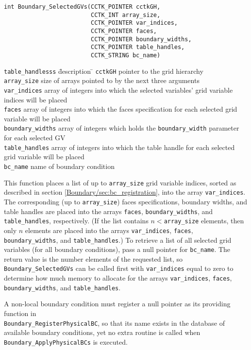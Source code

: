 \documentclass{article}
\begin{document}
\begin{verbatim}
int Boundary_SelectedGVs(CCTK_POINTER cctkGH, 
                         CCTK_INT array_size,
                         CCTK_POINTER var_indices,
                         CCTK_POINTER faces,
                         CCTK_POINTER boundary_widths,
                         CCTK_POINTER table_handles,
                         CCTK_STRING bc_name)
\end{verbatim}
\begin{tabbing}
\texttt{table\_handlesss} \= description \=\kill
\texttt{cctkGH} \> pointer to the grid hierarchy\\
\texttt{array\_size} \> size of arrays pointed to by the next three arguments\\
\texttt{var\_indices} \> array of integers into which the selected variables' grid variable indices will be placed\\
\texttt{faces} \> array of integers into which the faces specification for each selected grid variable will be placed\\
\texttt{boundary\_widths} \> array of integers which holds the \texttt{boundary\_width} parameter for each selected GV\\
\texttt{table\_handles} \> array of integers into which the table handle for each selected grid variable will be placed\\
\texttt{bc\_name} \> name of boundary condition
\end{tabbing}
This function places a list of up to \texttt{array\_size} grid
variable indices, sorted as described in section
\ref{Boundary/sec:bc_registration}, into the array \texttt{var\_indices}.  The
corresponding (up to \texttt{array\_size}) faces specifications,
boundary widths, and table handles are placed into the arrays
\texttt{faces}, \texttt{boundary\_widths}, and
\texttt{table\_handles}, respectively.  (If the list contains
$n<$\texttt{array\_size} elements, then only $n$ elements are placed
into the arrays \texttt{var\_indices}, \texttt{faces},
\texttt{boundary\_widths}, and \texttt{table\_handles}.)  To retrieve
a list of all selected grid variables (for all boundary conditions),
pass a null pointer for \texttt{bc\_name}.  The return value is the
number elements of the requested list, so
\texttt{Boundary\_SelectedGVs} can be called first with
\texttt{var\_indices} equal to zero to determine how much memory to
allocate for the arrays \texttt{var\_indices}, \texttt{faces},
\texttt{boundary\_widths}, and \texttt{table\_handles}.

A non-local boundary condition must register a null pointer as its
providing function in\\ \texttt{Boundary\_RegisterPhysicalBC}, so that
its name exists in the database of available boundary conditions, yet
no extra routine is called when \texttt{Boundary\_ApplyPhysicalBCs} is
executed.

\end{document}
